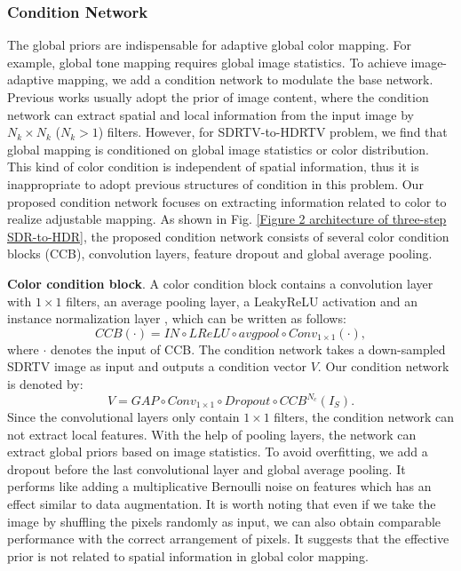 \documentclass[10pt,twocolumn,letterpaper]{article}
\begin{document}
\subsubsection{Condition Network}
The global priors are indispensable for adaptive global color mapping. For example, global tone mapping requires global image statistics. To achieve image-adaptive mapping, we add a condition network to modulate the base network. Previous works \cite{wang2018recovering, he2020conditional, chen2021hdrunet} usually adopt the prior of image content, where the condition network can extract spatial and local information from the input image by $N_k\times N_k$ ($N_k>1$) filters. However, for SDRTV-to-HDRTV problem, we find that global mapping is conditioned on global image statistics or color distribution. This kind of color condition is independent of spatial information, thus it is inappropriate to adopt previous structures of condition in this problem. Our proposed condition network focuses on extracting information related to color to realize adjustable mapping. As shown in Fig. \ref{Figure 2 architecture of three-step SDR-to-HDR}, the proposed condition network consists of several color condition blocks (CCB), convolution layers, feature dropout and global average pooling.

\textbf{Color condition block}. A color condition block contains a convolution layer with $1\times 1$ filters, an average pooling layer, a LeakyReLU activation and an instance normalization layer \cite{dumoulin2016learned}, which can be written as follows:
\begin{equation}
   CCB(\cdot)=IN\circ LReLU\circ avgpool\circ Conv_{1\times 1}(\cdot),
\end{equation}
where $\cdot $ denotes the input of CCB. The condition network takes a down-sampled SDRTV image as input and outputs a condition vector $V$. Our condition network is denoted by:
\begin{equation}
   V=GAP\circ Conv_{1\times 1}\circ Dropout\circ CCB^{N_c}(I_{S}).
\end{equation}
Since the convolutional layers only contain $1\times 1$ filters, the condition network can not extract local features. With the help of pooling layers, the network can extract global priors based on image statistics. To avoid overfitting, we add a dropout before the last convolutional layer and global average pooling. It performs like adding a multiplicative Bernoulli noise on features which has an effect similar to data augmentation. It is worth noting that even if we take the image by shuffling the pixels randomly as input, we can also obtain comparable performance with the correct arrangement of pixels. It suggests that the effective prior is not related to spatial information in global color mapping.
\end{document}

